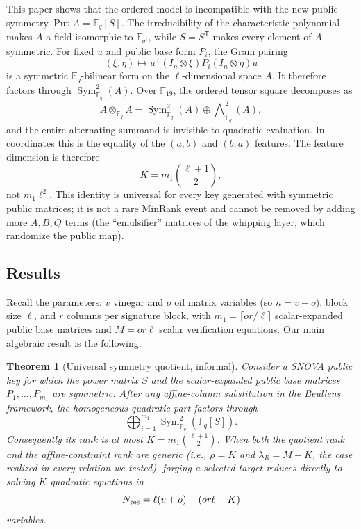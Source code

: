 \documentclass[11pt]{article}
\newtheorem{theorem}{Theorem}
\newcommand{\F}{\mathbb F}
\newcommand{\Sym}{\operatorname{Sym}}
\newcommand{\transpose}{\mathsf T}
\newcommand{\SNOVA}{\textsf{SNOVA}}
\begin{document}
This paper shows that the ordered model is incompatible with the new public symmetry.  Put $A=\F_q[S]$.  The irreducibility of the characteristic polynomial makes $A$ a field isomorphic to $\F_{q^\ell}$, while $S=S^\transpose$ makes every element of $A$ symmetric.  For fixed $u$ and public base form $P_i$, the Gram pairing
\[
 (\xi,\eta)\longmapsto
 u^\transpose(I_n\otimes\xi)P_i(I_n\otimes\eta)u
\]
is a symmetric $\F_q$-bilinear form on the $\ell$-dimensional space $A$.  It therefore factors through $\Sym^2_{\F_q}(A)$.  Over $\F_{19}$, the ordered tensor square decomposes as
\[
 A\otimes_{\F_q}A
 =\Sym^2_{\F_q}(A)\oplus\bigwedge\nolimits^2_{\F_q}(A),
\]
and the entire alternating summand is invisible to quadratic evaluation.  In coordinates this is the equality of the $(a,b)$ and $(b,a)$ features.  The feature dimension is therefore
\[
 K=m_1\binom{\ell+1}{2},
\]
not $m_1\ell^2$.  This identity is universal for every key generated with symmetric public matrices; it is not a rare MinRank event and cannot be removed by adding more $A,B,Q$ terms (the ``emulsifier'' matrices of the whipping layer, which randomize the public map).

\subsection{Results}

Recall the parameters: $v$ vinegar and $o$ oil matrix variables (so $n=v+o$), block size $\ell$, and $r$ columns per signature block, with $m_1=\lceil or/\ell\rceil$ scalar-expanded public base matrices and $M=or\ell$ scalar verification equations.  Our main algebraic result is the following.

\begin{theorem}[Universal symmetry quotient, informal]\label{thm:intro}
Consider a \SNOVA{} public key for which the power matrix $S$ and the scalar-expanded public base matrices $P_1,\ldots,P_{m_1}$ are symmetric.  After any affine-column substitution in the Beullens framework, the homogeneous quadratic part factors through
\[
 \bigoplus_{i=1}^{m_1}\Sym^2_{\F_q}(\F_q[S]).
\]
Consequently its rank is at most $K=m_1\binom{\ell+1}{2}$.  When both the quotient rank and the affine-constraint rank are generic (i.e., $\rho=K$ and $\lambda_R=M-K$, the case realized in every relation we tested), forging a selected target reduces directly to solving $K$ quadratic equations in
\[
 N_{\rm res}=\ell(v+o)-\left(or\ell-K\right)
\]
variables.
\end{theorem}
\end{document}
